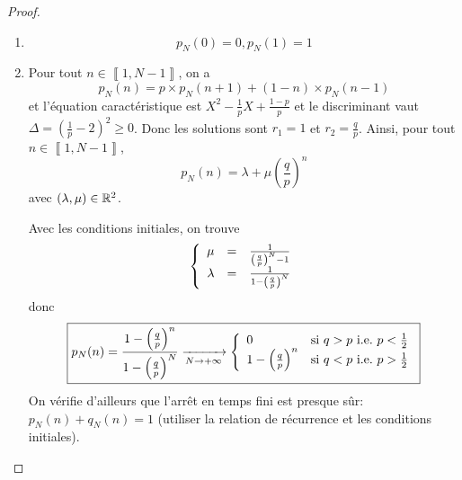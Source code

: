 \begin{proof}
    \phantom{}
    \begin{enumerate}
        \item 
        \begin{equation}
            \boxed{p_{N}(0)=0,p_{N}(1)=1}    
        \end{equation}

        \item Pour tout $n\in\left\llbracket 1,N-1\right\rrbracket$, on a 
        \begin{equation}
            p_{N}(n)=p\times p_{N}(n+1)+(1-n)\times p_{N}(n-1)
        \end{equation}
        et l'équation caractéristique est $X^{2}-\frac{1}{p}X+\frac{1-p}{p}$ et le discriminant vaut $\Delta=\left(\frac{1}{p}-2\right)^{2}\geqslant0$. Donc les solutions sont $r_{1}=1$ et $r_{2}=\frac{q}{p}$. Ainsi, pour tout $n\in\left\llbracket 1,N-1\right\rrbracket$,
        \begin{equation}
            p_{N}(n)=\lambda+\mu\left(\frac{q}{p}\right)^{n}
        \end{equation}
        avec $\left(\lambda,\mu\right)\in\mathbb{R}^{2}$.
        
        Avec les conditions initiales, on trouve 
        \begin{equation}
            \left\{
                \begin{array}[]{rcl}
                    \mu &= &\frac{1}{\left(\frac{q}{p}\right)^{N}-1}\\
                    \lambda &= &\frac{1}{1-\left(\frac{q}{p}\right)^{N}}
                \end{array}
            \right.
        \end{equation}
        donc 
        \begin{equation}
            \boxed{
            p_{N}(n)=\frac{1-\left(\frac{q}{p}\right)^{n}}{1-\left(\frac{q}{p}\right)^{N}}\xrightarrow[N\to+\infty]{}
            \left\{
                \begin{array}[]{ll}
                    0 &\text{si }q>p\text{ i.e.~}p<\frac{1}{2}\\
                    1-\left(\frac{q}{p}\right)^{n} &\text{si }q<p\text{ i.e.~}p>\frac{1}{2}
                \end{array}
            \right.}
        \end{equation}
        On vérifie d'ailleurs que l'arrêt en temps fini est presque sûr: $p_{N}(n)+q_{N}(n)=1$ (utiliser la relation de récurrence et les conditions initiales).
    \end{enumerate}
\end{proof}

